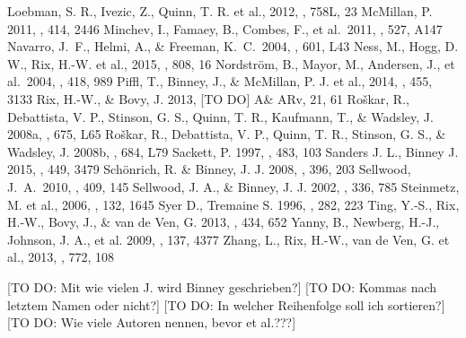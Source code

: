 \documentclass[12pt,preprint]{aastex}
\begin{document}
\begin{thebibliography}{}
 Loebman, S. R., Ivezic, Z., Quinn, T. R. et al., 2012, \apj, 758L, 23
 McMillan, P. 2011, \mnras, 414, 2446
 Minchev, I., Famaey, B., Combes, F., et al.\ 2011, \aap, 527, A147 
 Navarro, J.~F., Helmi, 
A., \& Freeman, K.~C.\ 2004, \apjl, 601, L43 
 Ness, M., Hogg, D. W., Rix, H.-W. et al., 2015, \apj, 808, 16
 Nordstr{\"o}m, B., Mayor, M., Andersen, J., et al.\ 2004, \aap, 418, 989 
 Piffl, T., Binney, J., \& McMillan, P. J. et al., 2014, \mnras, 455, 3133
 Rix, H.-W., \& Bovy, J. 2013, [TO DO] A\& ARv, 21, 61
 Ro\v{s}kar, R., Debattista, V. P., Stinson, G. S., Quinn, T. R., Kaufmann, T., \& Wadsley, J. 2008a, \apj, 675, L65
 Ro\v{s}kar, R., Debattista, V. P., Quinn, T. R., Stinson, G. S., \& Wadsley, J. 2008b, \apj, 684, L79
 Sackett, P. 1997, \apj, 483, 103
 Sanders J. L., Binney J. 2015, \mnras, 449, 3479
 Sch\"{o}nrich, R. \& Binney, J. J. 2008, \mnras, 396, 203
 Sellwood, J.~A.\ 2010, \mnras, 409, 145 
 Sellwood, J. A., \& Binney, J. J. 2002, \mnras, 336, 785
 Steinmetz, M. et al., 2006, \aj, 132, 1645
 Syer D., Tremaine S. 1996, \mnras, 282, 223
 Ting, Y.-S., Rix, H.-W., Bovy, J., \& van de Ven, G. 2013, \mnras, 434, 652
 Yanny, B., Newberg, H.-J., Johnson, J. A., et al. 2009, \aj, 137, 4377 
 Zhang, L., Rix, H.-W., van de Ven, G. et al., 2013, \apj, 772, 108
\end{thebibliography}

[TO DO: Mit wie vielen J. wird Binney geschrieben?] [TO DO: Kommas nach letztem Namen oder nicht?] [TO DO: In welcher Reihenfolge soll ich sortieren?] [TO DO: Wie viele Autoren nennen, bevor et al.???]


\end{document}
